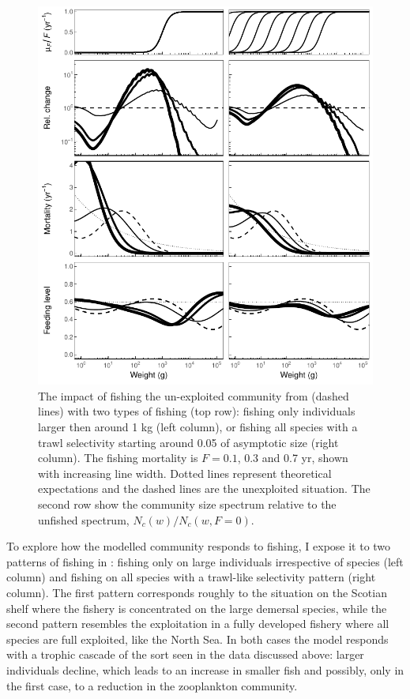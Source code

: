\afterpage{\clearpage}
\begin{figure}[p]
  \centering
  \includegraphics{ChapterCommunityFishing/Cascades.pdf}
  \caption{The impact of fishing the un-exploited community from  (dashed lines) with two types of fishing (top row): fishing only individuals larger then around 1 kg (left column), or fishing all species with a trawl selectivity starting around 0.05 of asymptotic size (right column).  The fishing mortality is $F=0.1$, 0.3 and 0.7 yr\per, shown with increasing line width.  Dotted lines represent theoretical expectations and the dashed lines are the unexploited situation.  The second row show the community size spectrum relative to the unfished spectrum, $N_c(w)/N_c(w, F=0)$.}
  \label{fig:Cascades}
\end{figure}
 
To explore how the modelled community responds to fishing, I expose it to two patterns of fishing in : fishing only on large individuals irrespective of species (left column) and fishing on all species with a trawl-like selectivity pattern (right column).  The first pattern corresponds roughly to the situation on the Scotian shelf where the fishery is concentrated on the large demersal species, while the second pattern resembles the exploitation in a fully developed fishery where all species are full exploited, like the North Sea.  In both cases the model responds with a trophic cascade of the sort seen in the data discussed above: larger individuals decline, which leads to an increase in smaller fish and possibly, only in the first case, to a reduction in the zooplankton community.  

